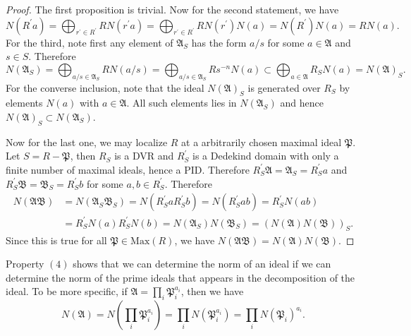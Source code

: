 \begin{proof}
The first proposition is trivial. Now for the second statement, we have 
$$
N\left( R^{\prime}a \right) =\bigoplus_{r^{\prime}\in R^{\prime}}{RN\left( r^{\prime}a \right)}=\bigoplus_{r^{\prime}\in R^{\prime}}{RN\left( r^{\prime} \right) N\left( a \right)}=N\left( R^{\prime} \right) N\left( a \right) =RN\left( a \right) .
$$
For the third, note first any element of $\mathfrak{A}_S$ has the form $a/s$ for some $a\in\mathfrak{A}$ and $s\in S$. Therefore 
$$
N\left( \mathfrak{A} _S \right) =\bigoplus_{a/s\in \mathfrak{A} _S}{RN\left( a/s \right)}=\bigoplus_{a/s\in \mathfrak{A} _S}{Rs^{-n}N\left( a \right)}\subset \bigoplus_{a\in \mathfrak{A}}{R_SN\left( a \right)}=N\left( \mathfrak{A} \right) _S.
$$
For the converse inclusion, note that the ideal $N(\mathfrak{A})_S$ is generated over $R_S$ by elements $N(a)$ with $a\in\mathfrak{A}$. All such elements lies in $N(\mathfrak{A}_S)$ and hence $N(\mathfrak{A})_S\subset N(\mathfrak{A}_S)$.\par
Now for the last one, we may localize $R$ at a arbitrarily chosen maximal ideal $\mathfrak{P}$. Let $S=R-\mathfrak{P}$, then $R_S$ is a DVR and $R_S^\prime$ is a Dedekind domain with only a finite number of maximal ideals, hence a PID. Therefore $R_S^\prime\mathfrak{A}=\mathfrak{A}_S=R_S^\prime a$ and $R_S^\prime\mathfrak{B}=\mathfrak{B}_S=R_S^\prime b$ for some $a,b\in R_S^\prime$. Therefore 
$$
\begin{aligned}
N\left( \mathfrak{A} \mathfrak{B} \right) &=N\left( \mathfrak{A} _S\mathfrak{B} _S \right) =N\left( R_{S}^{\prime}aR_{S}^{\prime}b \right) =N\left( R_{S}^{\prime}ab \right) =R_{S}^{\prime}N\left( ab \right) 
\\
&=R_{S}^{\prime}N\left( a \right) R_{S}^{\prime}N\left( b \right) =N\left( \mathfrak{A} _S \right) N\left( \mathfrak{B} _S \right) =\left( N\left( \mathfrak{A} \right) N\left( \mathfrak{B} \right) \right) _S.
\end{aligned}
$$
Since this is true for all $\mathfrak{P}\in\mathrm{Max}(R)$, we have $N(\mathfrak{AB})=N(\mathfrak{A})N(\mathfrak{B})$.
\end{proof}
Property $(4)$ shows that we can determine the norm of an ideal if we can determine the norm of the prime ideals that appears in the decomposition of the ideal. To be more specific, if $\mathfrak{A}=\prod_i\mathfrak{P}_i^{a_i}$, then we have 
$$
N\left( \mathfrak{A} \right) =N\left( \prod_i{\mathfrak{P} _{i}^{a_i}} \right) =\prod_i{N\left( \mathfrak{P} _{i}^{a_i} \right)}=\prod_i{N\left( \mathfrak{P} _i \right) ^{a_i}}.
$$
